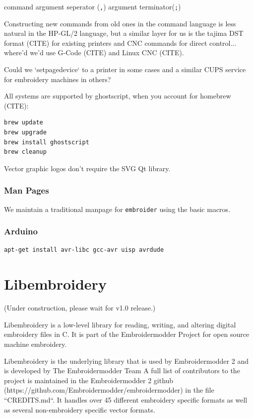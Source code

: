\documentclass[10pt]{report}
\begin{document}
command argument seperator (\texttt{,}) argument terminator(\texttt{;})

Constructing new commands from old ones in the command language is less
natural in the HP-GL/2 language, but a similar layer for us is
the tajima DST format (CITE) for existing printers and CNC commands for
direct control... where'd we'd use G-Code (CITE) and Linux CNC (CITE).

Could we `setpagedevice` to a printer in some cases and a similar CUPS service
for embroidery machines in others?

All systems are supported by ghostscript, when you account for homebrew (CITE):

\begin{lstlisting}
brew update
brew upgrade
brew install ghostscript
brew cleanup
\end{lstlisting}

Vector graphic logos don't require the SVG Qt library.

\subsection{Man Pages}

We maintain a traditional manpage for \texttt{embroider} using
the basic macros.

\subsection{Arduino}

\begin{lstlisting}
apt-get install avr-libc gcc-avr uisp avrdude
\end{lstlisting}

\chapter{Libembroidery}

(Under construction, please wait for v1.0 release.)

Libembroidery is a low-level library for reading, writing,
and altering digital embroidery files in C. It is part of the Embroidermodder Project
for open source machine embroidery.

Libembroidery is the underlying library that is used by Embroidermodder 2
and is developed by  The Embroidermodder Team %
A full list of contributors to the project is maintained in
the Embroidermodder 2 github (https://github.com/Embroidermodder/embroidermodder)
in the file ``CREDITS.md``. It handles over 45 different embroidery specific formats as well
as several non-embroidery specific vector formats.
\end{document}
